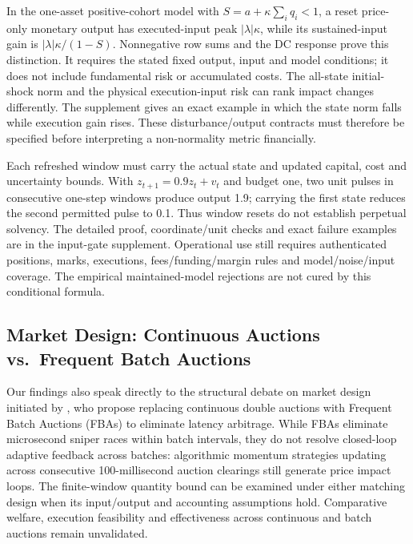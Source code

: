 \documentclass[12pt]{article}
\theoremstyle{definition}
\theoremstyle{remark}
\begin{document}
In the one-asset positive-cohort model with $S=a+\kappa\sum_iq_i<1$, a reset price-only monetary output has executed-input peak $|\lambda|\kappa$, while its sustained-input gain is $|\lambda|\kappa/(1-S)$. Nonnegative row sums and the DC response prove this distinction. It requires the stated fixed output, input and model conditions; it does not include fundamental risk or accumulated costs. The all-state initial-shock norm and the physical execution-input risk can rank impact changes differently. The supplement gives an exact example in which the state norm falls while execution gain rises. These disturbance/output contracts must therefore be specified before interpreting a non-normality metric financially.

Each refreshed window must carry the actual state and updated capital, cost and uncertainty bounds. With $z_{t+1}=0.9z_t+v_t$ and budget one, two unit pulses in consecutive one-step windows produce output 1.9; carrying the first state reduces the second permitted pulse to 0.1. Thus window resets do not establish perpetual solvency. The detailed proof, coordinate/unit checks and exact failure examples are in the input-gate supplement. Operational use still requires authenticated positions, marks, executions, fees/funding/margin rules and model/noise/input coverage. The empirical maintained-model rejections are not cured by this conditional formula.

\subsection{Market Design: Continuous Auctions vs.\ Frequent Batch Auctions}
Our findings also speak directly to the structural debate on market design initiated by \citet{budish2015}, who propose replacing continuous double auctions with Frequent Batch Auctions (FBAs) to eliminate latency arbitrage. While FBAs eliminate microsecond sniper races within batch intervals, they do not resolve closed-loop adaptive feedback across batches: algorithmic momentum strategies updating across consecutive 100-millisecond auction clearings still generate price impact loops. The finite-window quantity bound can be examined under either matching design when its input/output and accounting assumptions hold. Comparative welfare, execution feasibility and effectiveness across continuous and batch auctions remain unvalidated.
\end{document}
